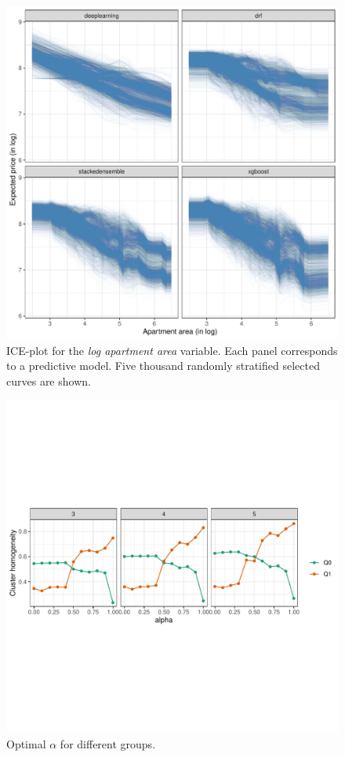 \documentclass[smallextended,natbib]{svjour3}\usepackage[]{graphicx}\usepackage[]{xcolor}
\begin{document}
\begin{figure}[hbpt]
    \centering
    \includegraphics[scale=0.6]{figures/fig-ice-sup-dec.pdf}
    \caption{ICE-plot for the \textit{log apartment area} variable. Each panel corresponds to a predictive model. Five thousand randomly stratified selected curves are shown.}
    \label{fig-icesup}
\end{figure}

\begin{figure}[hbpt] 
    \centering
    \includegraphics[trim=0 4cm 0 4cm, clip, scale=.6]{figures/fig-alphaoptimo.pdf}
    \caption{Optimal $\alpha$ for different groups.}
    \label{alpfaoptimo}
\end{figure}
\end{document}
